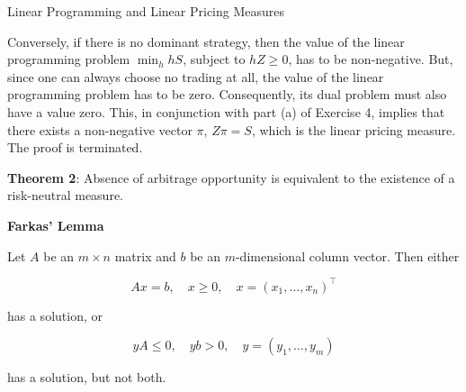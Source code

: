 \documentclass{beamer}
\begin{document}
\begin{frame}{Linear Programming and Linear Pricing Measures}

    {\footnotesize \footnotesize
    \par Conversely, if there is no dominant strategy, 
    then the value of the linear programming problem $\min_h hS$, 
    subject to $hZ \geq 0$, has to be non-negative. But, since one can 
    always choose no trading at all, the value of the linear programming 
    problem has to be zero. Consequently, its dual problem must also have a value 
    zero. This, in conjunction with part (a) of Exercise 4, implies that 
    there exists a non-negative vector $\pi$, $Z\pi = S$,
     which is the linear pricing measure. The proof is terminated.
     \vspace{1em}
    \par \textbf{Theorem 2}: Absence of arbitrage opportunity is equivalent 
    to the existence of a risk-neutral measure.
    \vspace{1em}
    \par \textbf{Farkas' Lemma}
    \par Let $A$ be an $m \times n$ matrix and $b$ be an $m$-dimensional column vector. Then either

    \[
    Ax = b, \quad x \geq 0, \quad x = (x_1, \ldots, x_n)^\top
    \]

    has a solution, or

    \[
    yA \leq 0, \quad yb > 0, \quad y = (y_1, \ldots, y_m)
    \]

    has a solution, but not both.

    }
\end{frame}
\end{document}
